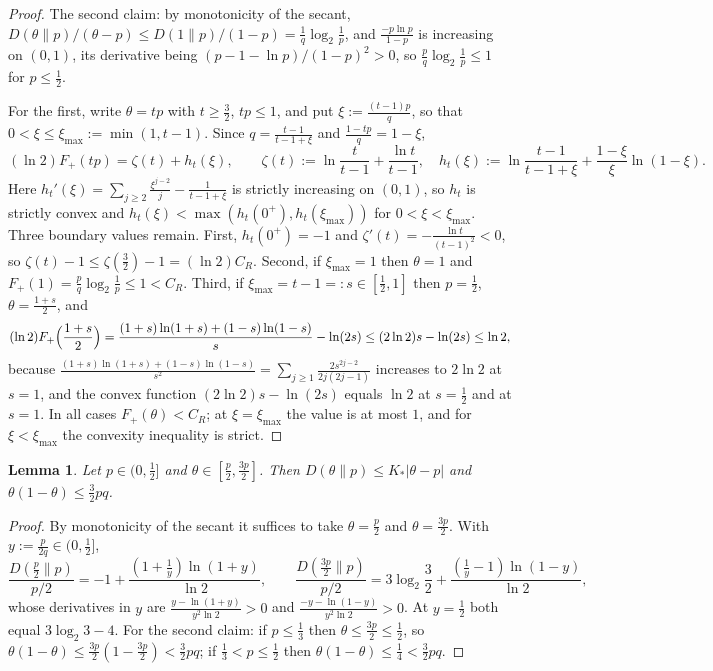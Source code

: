 \documentclass[11pt]{amsart}
\newtheorem{lemma}{Lemma}[section]
\theoremstyle{remark}
\begin{document}
\begin{proof}
The second claim: by monotonicity of the secant, $D(\theta\|p)/(\theta - p) \le D(1\|p)/(1-p) = \frac1q\log_2\frac1p$, and $\frac{-p\ln p}{1-p}$ is increasing on $(0,1)$, its derivative being $(p - 1 - \ln p)/(1-p)^2 > 0$, so $\frac pq\log_2\frac1p \le 1$ for $p \le \frac12$.

For the first, write $\theta = tp$ with $t \ge \frac32$, $tp \le 1$, and put $\xi := \frac{(t-1)p}{q}$, so that $0 < \xi \le \xi_{\max} := \min(1, t - 1)$. Since $q = \frac{t-1}{t-1+\xi}$ and $\frac{1 - tp}{q} = 1 - \xi$,
\[
(\ln 2)F_+(tp) = \zeta(t) + h_t(\xi), \qquad \zeta(t) := \ln\frac{t}{t-1} + \frac{\ln t}{t-1}, \quad h_t(\xi) := \ln\frac{t-1}{t-1+\xi} + \frac{1-\xi}{\xi}\ln(1-\xi).
\]
Here $h_t'(\xi) = \sum_{j \ge 2} \frac{\xi^{j-2}}{j} - \frac{1}{t-1+\xi}$ is strictly increasing on $(0,1)$, so $h_t$ is strictly convex and $h_t(\xi) < \max(h_t(0^+), h_t(\xi_{\max}))$ for $0 < \xi < \xi_{\max}$. Three boundary values remain. First, $h_t(0^+) = -1$ and $\zeta'(t) = -\frac{\ln t}{(t-1)^2} < 0$, so $\zeta(t) - 1 \le \zeta(\frac32) - 1 = (\ln 2)C_R$. Second, if $\xi_{\max} = 1$ then $\theta = 1$ and $F_+(1) = \frac pq\log_2\frac1p \le 1 < C_R$. Third, if $\xi_{\max} = t - 1 =: s \in [\frac12, 1]$ then $p = \frac12$, $\theta = \frac{1+s}{2}$, and
\[
(\ln 2)F_+\Bigl(\frac{1+s}{2}\Bigr) = \frac{(1+s)\ln(1+s) + (1-s)\ln(1-s)}{s} - \ln(2s) \le (2\ln 2)s - \ln(2s) \le \ln 2,
\]
because $\frac{(1+s)\ln(1+s) + (1-s)\ln(1-s)}{s^2} = \sum_{j \ge 1}\frac{2s^{2j-2}}{2j(2j-1)}$ increases to $2\ln 2$ at $s = 1$, and the convex function $(2\ln 2)s - \ln(2s)$ equals $\ln 2$ at $s = \frac12$ and at $s = 1$. In all cases $F_+(\theta) < C_R$; at $\xi = \xi_{\max}$ the value is at most $1$, and for $\xi < \xi_{\max}$ the convexity inequality is strict.
\end{proof}

\begin{lemma}\label{lem:central}
Let $p \in (0,\frac12]$ and $\theta \in [\frac p2, \frac{3p}{2}]$. Then $D(\theta\|p) \le K_*|\theta - p|$ and $\theta(1-\theta) \le \frac32 pq$.
\end{lemma}

\begin{proof}
By monotonicity of the secant it suffices to take $\theta = \frac p2$ and $\theta = \frac{3p}{2}$. With $y := \frac{p}{2q} \in (0, \frac12]$,
\[
\frac{D(\frac p2\|p)}{p/2} = -1 + \frac{(1 + \frac1y)\ln(1+y)}{\ln 2}, \qquad \frac{D(\frac{3p}{2}\|p)}{p/2} = 3\log_2\frac32 + \frac{(\frac1y - 1)\ln(1-y)}{\ln 2},
\]
whose derivatives in $y$ are $\frac{y - \ln(1+y)}{y^2\ln 2} > 0$ and $\frac{-y - \ln(1-y)}{y^2\ln 2} > 0$. At $y = \frac12$ both equal $3\log_2 3 - 4$. For the second claim: if $p \le \frac13$ then $\theta \le \frac{3p}{2} \le \frac12$, so $\theta(1-\theta) \le \frac{3p}{2}(1 - \frac{3p}{2}) < \frac32 pq$; if $\frac13 < p \le \frac12$ then $\theta(1-\theta) \le \frac14 < \frac32 pq$.
\end{proof}
\end{document}
